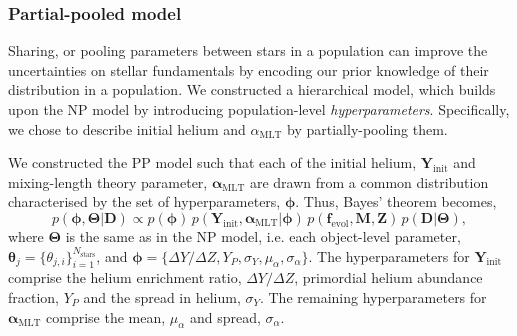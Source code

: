 \documentclass[a4paper,fleqn,usenatbib]{mnras}
\newcommand{\mlt}{\ensuremath{{\alpha_\mathrm{MLT}}}}
\begin{document}
\subsubsection{Partial-pooled model}\label{sec:pp}

Sharing, or pooling parameters between stars in a population can improve the uncertainties on stellar fundamentals by encoding our prior knowledge of their distribution in a population. We constructed a hierarchical model, which builds upon the NP model by introducing population-level \emph{hyperparameters}. Specifically, we chose to describe initial helium and $\mlt$ by partially-pooling them.

We constructed the PP model such that each of the initial helium, $\boldsymbol{Y}_\mathrm{init}$ and mixing-length theory parameter, $\boldsymbol{\alpha}_\mathrm{MLT}$ are drawn from a common distribution characterised by the set of hyperparameters, $\boldsymbol{\phi}$. Thus, Bayes' theorem becomes,
%
\begin{equation}
    p(\boldsymbol{\phi}, \boldsymbol{\Theta} | \boldsymbol{D}) \propto p(\boldsymbol{\phi}) \, p(\boldsymbol{Y}_\mathrm{init}, \boldsymbol{\alpha}_\mathrm{MLT} | \boldsymbol{\phi}) \, p(\boldsymbol{f}_{\mathrm{evol}}, \boldsymbol{M}, \boldsymbol{Z}) \, p(\boldsymbol{D} | \boldsymbol{\Theta}),
    \label{eq:hbmbayes}
\end{equation}
%
where $\boldsymbol{\Theta}$ is the same as in the NP model, i.e. each object-level parameter, $\boldsymbol{\theta}_j = \{\theta_{j, i}\}_{i=1}^{N_\mathrm{stars}}$, and $\boldsymbol{\phi} = \{\Delta Y/\Delta Z, Y_P, \sigma_Y, \mu_\alpha, \sigma_\alpha\}$. The hyperparameters for $\boldsymbol{Y}_\mathrm{init}$ comprise the helium enrichment ratio, ${\Delta Y}/{\Delta Z}$, primordial helium abundance fraction, $Y_P$ and the spread in helium, $\sigma_Y$. The remaining hyperparameters for $\boldsymbol{\alpha}_\mathrm{MLT}$ comprise the mean, $\mu_\alpha$ and spread, $\sigma_\alpha$.
\end{document}
